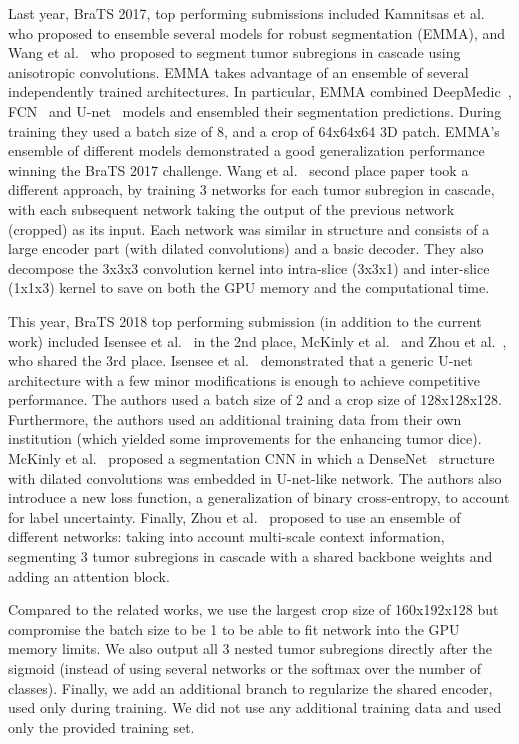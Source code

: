 \documentclass[runningheads]{llncs}
\newcommand{\0}{\ensuremath{\mathbf{0}}}
\newcommand{\1}{\ensuremath{\mathbf{1}}}
\begin{document}
Last year, BraTS 2017, top performing submissions included Kamnitsas et al.~\cite{Kamnitsas17} who proposed to ensemble several models for robust segmentation (EMMA), and  Wang et al.~\cite{Wang17} who proposed to segment tumor subregions in cascade using anisotropic convolutions. EMMA takes advantage of an ensemble of several independently trained architectures. In particular, EMMA combined DeepMedic~\cite{Kamnitsas16}, FCN~\cite{Long15} and U-net~\cite{Ronneberger15} models and ensembled their segmentation predictions. During training they used a batch size of 8, and a crop of 64x64x64 3D patch. EMMA's ensemble of different models demonstrated a good generalization performance winning the BraTS 2017 challenge. Wang et al.~\cite{Wang17} second place paper took a different approach, by training 3 networks for each tumor subregion in cascade, with each subsequent network taking the output of the previous network (cropped) as its input.  Each network was similar in structure and consists of a large encoder part (with dilated convolutions) and a basic decoder. They also decompose the 3x3x3 convolution kernel into intra-slice (3x3x1) and inter-slice (1x1x3) kernel to save on both the GPU memory and the computational time. 

This year, BraTS 2018 top performing submission (in addition to the current work) included Isensee et al.~\cite{Isensee18brats} in the 2nd place, McKinly et al.~\cite{McKinley18brats} and Zhou et al.~\cite{Zhou18brats}, who shared the 3rd place.  Isensee et al.~\cite{Isensee18brats} demonstrated that a generic U-net architecture with a few  minor modifications is enough to achieve competitive performance. 
The authors used a batch size of 2 and a crop size of 128x128x128. Furthermore, the authors used an additional training data from their own institution (which yielded some improvements for the enhancing tumor dice).
McKinly et al.~\cite{McKinley18brats} proposed a segmentation CNN in which a DenseNet~\cite{huang2017densely} structure with dilated convolutions was embedded in U-net-like network.  The authors also introduce a new loss function, a generalization of binary cross-entropy, to account for label uncertainty. Finally, Zhou et al.~\cite{Zhou18brats} proposed to use an ensemble of different networks: taking into account multi-scale context information,  segmenting 3 tumor subregions in cascade with a shared backbone weights and adding an attention block.  

Compared to the related works,  we use the largest crop size of 160x192x128 but compromise the batch size to be 1 to be able to fit network into the GPU memory limits. We also output all 3 nested tumor subregions  directly after the sigmoid (instead of using several networks or the softmax over the number of classes). Finally, we add an additional branch to regularize the shared encoder, used only during training. We did not use any additional training data and used only the provided training set. 
\end{document}

